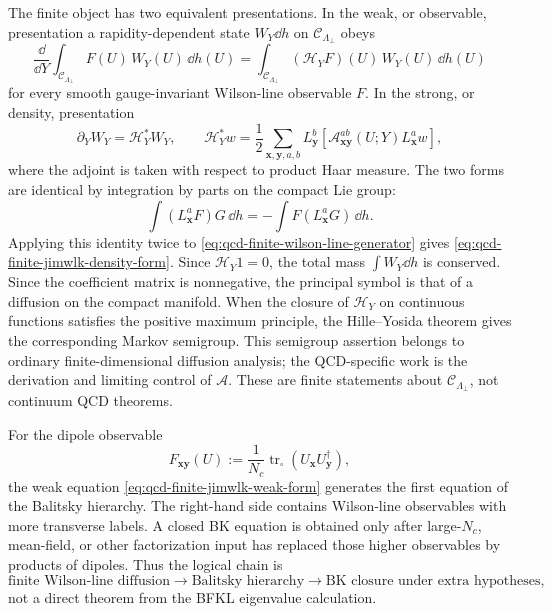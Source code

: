 The finite object has two equivalent presentations.  In the weak, or
observable, presentation a rapidity-dependent state \(W_Y\dd h\) on
\(\mathcal C_{\Lambda_\perp}\) obeys
\begin{equation}
  \frac{\dd}{\dd Y}
  \int_{\mathcal C_{\Lambda_\perp}}F(U)\,W_Y(U)\,\dd h(U)
  =
  \int_{\mathcal C_{\Lambda_\perp}}(\mathcal H_YF)(U)\,W_Y(U)\,\dd h(U)
  \label{eq:qcd-finite-jimwlk-weak-form}
\end{equation}
for every smooth gauge-invariant Wilson-line observable \(F\).  In the strong,
or density, presentation
\begin{equation}
  \partial_YW_Y=\mathcal H_Y^*W_Y,
  \qquad
  \mathcal H_Y^*w
  =
  \frac12
  \sum_{\mathbf x,\mathbf y,a,b}
  L_{\mathbf y}^b
  \left[
    \mathcal A_{\mathbf x\mathbf y}^{ab}(U;Y)
    L_{\mathbf x}^aw
  \right],
  \label{eq:qcd-finite-jimwlk-density-form}
\end{equation}
where the adjoint is taken with respect to product Haar measure.  The two
forms are identical by integration by parts on the compact Lie group:
\[
  \int (L_{\mathbf x}^aF)G\,\dd h
  =
  -\int F(L_{\mathbf x}^aG)\,\dd h .
\]
Applying this identity twice to
\eqref{eq:qcd-finite-wilson-line-generator} gives
\eqref{eq:qcd-finite-jimwlk-density-form}.  Since
\(\mathcal H_Y1=0\), the total mass \(\int W_Y\dd h\) is conserved.  Since
the coefficient matrix is nonnegative, the principal symbol is that of a
diffusion on the compact manifold.  When the closure of \(\mathcal H_Y\) on
continuous functions satisfies the positive maximum principle, the
Hille--Yosida theorem gives the corresponding Markov semigroup.  This
semigroup assertion belongs to ordinary finite-dimensional diffusion analysis;
the QCD-specific work is the derivation and limiting control of
\(\mathcal A\).  These are finite statements about
\(\mathcal C_{\Lambda_\perp}\), not continuum QCD theorems.

For the dipole observable
\begin{equation}
  F_{\mathbf x\mathbf y}(U)
  :=
  \frac1{N_c}
  \operatorname{tr}_{\square}(U_{\mathbf x}U_{\mathbf y}^\dagger),
  \label{eq:qcd-finite-dipole-observable}
\end{equation}
the weak equation
\eqref{eq:qcd-finite-jimwlk-weak-form} generates the first equation of the
Balitsky hierarchy.  The right-hand side contains Wilson-line observables with
more transverse labels.  A closed BK equation is obtained only after
large-\(N_c\), mean-field, or other factorization input has replaced those
higher observables by products of dipoles.  Thus the logical chain is
\[
  \text{finite Wilson-line diffusion}
  \longrightarrow
  \text{Balitsky hierarchy}
  \longrightarrow
  \text{BK closure under extra hypotheses},
\]
not a direct theorem from the BFKL eigenvalue calculation.

